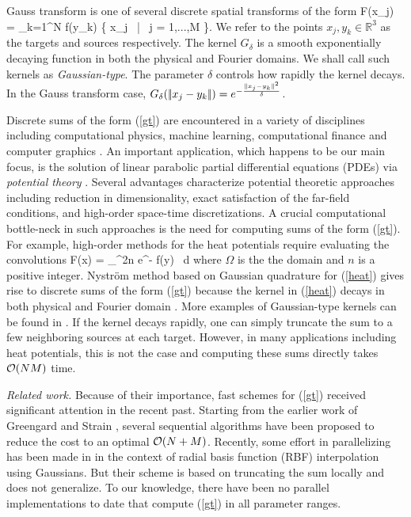 Gauss transform is one of several discrete spatial transforms of the form 
%
\beq F(x_j) = \sum_{k=1}^N  f(y_k) \quad {} \quad \{ x_j \, | \, j = 1,...,M \}.  \label{gt} \eeq
%
We refer to the points $ x_j, y_k \in \mathbb{R}^3 $ as the targets and sources respectively. The kernel $G_\delta$ is a smooth exponentially decaying function in both the physical and Fourier domains. We shall call such kernels as {\em Gaussian-type}. The parameter $\delta$ controls how rapidly the kernel decays.  In the Gauss transform case, $G_\delta (|\!| x_j - y_k |\!|) = e^{-\frac{|\!| x_j - y_k |\!|^2}{\delta}}$. 

Discrete sums of the form (\ref{gt}) are encountered in a variety of disciplines including computational physics,
 machine learning, computational finance and computer graphics \cite{strain94adap, elgammal03, broadie03, kim05, veerapaneni08}. An important application, which happens to be our main focus, is the solution of linear parabolic partial differential equations (PDEs) via {\em potential theory} \cite{kress99}. Several advantages characterize potential theoretic approaches including reduction in dimensionality, exact satisfaction of the far-field conditions, and high-order space-time discretizations. A crucial computational bottle-neck in such approaches is the need for computing sums of the form (\ref{gt}). For example, high-order methods for the heat potentials require evaluating the convolutions \cite{li09, skv09}
% 
\beq F(x) = \int_\Omega {}^{2n} e^{-} f(y) \, d\Omega \label{heat} \eeq
% 
where $\Omega$ is the the domain and $n$ is a positive integer. Nystr\"{o}m method based on Gaussian quadrature for (\ref{heat}) gives rise to discrete sums of the form (\ref{gt}) because the kernel in (\ref{heat}) decays in both physical and Fourier domain \cite{fggt}. More examples of Gaussian-type kernels can be found in \cite{victor03}. If the kernel decays rapidly, one can simply truncate the sum to a few neighboring sources at each target. However, in many applications including heat potentials, this is not the case and computing these sums directly takes $\mathcal{O}(NM)$ time. 

{\em Related work.} Because of their importance, fast schemes for (\ref{gt}) received significant attention in the recent past. 
Starting from the earlier work of Greengard and Strain \cite{fgt}, several sequential algorithms \cite{greengard98, sun02, duraiswami03, tausch09, fggt} have been proposed to reduce the cost to an optimal $\mathcal{O}(N+M)$. Recently, some effort in parallelizing has been made in \cite{rio09} in the context of radial basis function (RBF) interpolation using Gaussians. But their scheme is based on truncating the sum locally and does not generalize. To our knowledge, there have been no parallel implementations to date that compute (\ref{gt}) in all parameter ranges. 

